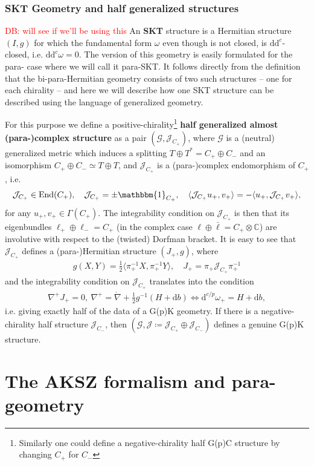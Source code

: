 \documentclass[letterpaper,12pt]{article}
\newcommand{\TT}{{T\oplus T^*}}
\newcommand{\JJ}{\mathcal{J}}
\newcommand{\GG}{\mathcal{G}}
\newcommand{\id}{\mathbbm{1}}
\newcommand{\lc}{\mathring{\n}}
\newcommand{\n}{\nabla}
\newcommand{\rd}{\mathrm{d}}
\newcommand{\se}{\Gamma}
\newcommand{\la}{\langle}
\newcommand{\ra}{\rangle}
\theoremstyle{definition}
\theoremstyle{remark}
\theoremstyle{examples}
\DeclareMathOperator{\End}{End}
\def\david{\textcolor{red}{DB: }\textcolor{red}}
\begin{document}
\subsubsection{SKT Geometry and half generalized structures}
\david{will see if we'll be using this}
An {\bf SKT} structure is a Hermitian structure $(I,g)$ for which the fundamental form $\omega$ even though is not closed, is $\rd \rd^c$-closed, i.e. $\rd \rd^c \omega=0$. The version of this geometry is easily formulated for the para- case where we will call it para-SKT. It follows directly from the definition that the bi-para-Hermitian geometry consists of two such structures -- one for each chirality -- and here we will describe how one SKT structure can be described using the language of generalized geometry.

For this purpose we define a positive-chirality\footnote{Similarly one could define a negative-chirality half G(p)C structure by changing $C_+$ for $C_-$} {\bf half generalized almost (para-)complex structure} as a pair $(\GG,\JJ_{C_+})$, where $\GG$ is a (neutral) generalized metric which induces a splitting $\TT=C_+\oplus C_-$ and an isomorphism $C_+\oplus C_-\simeq T\oplus T$, and $\JJ_{C_+}$ is a (para-)complex endomorphism of $C_+$, i.e.
\begin{align*}
\JJ_{C_+}\in \End(C_+),\quad \JJ_{C_+}=\pm \id_{C_+},\quad \la \JJ_{C_+} u_+,v_+\ra=-\la u_+,\JJ_{C_+} v_+\ra,
\end{align*}
for any $u_+,v_+ \in \se(C_+)$. The integrability condition on $\JJ_{C_+}$ is then that its eigenbundles $\ell_+\oplus \ell_-=C_+$ (in the complex case $\ell\oplus \bar{\ell}=C_+\otimes \mathbb{C}$) are involutive with respect to the (twisted) Dorfman bracket. It is easy to see that $\JJ_{C_+}$ defines a (para-)Hermitian structure $(J_+,g)$, where
\begin{align*}
g(X,Y)=\frac{1}{2}\la \pi_+^{-1}X,\pi_+^{-1}Y\ra,\quad J_+=\pi_+\JJ_{C_+}\pi^{-1}_+
\end{align*}
and the integrability condition on $\JJ_{C_+}$ translates into the condition
\begin{align*}
\n^+J_+=0,\ \n^+=\lc+\frac{1}{2}g^{-1}(H+\rd b) \Longleftrightarrow \rd^{c/p}\omega_+=H+\rd b,
\end{align*}
i.e. giving exactly half of the data of a G(p)K geometry. If there is a negative-chirality half structure $\JJ_{C_-}$, then $(\GG,\JJ\coloneqq \JJ_{C_+}\oplus \JJ_{C_-})$ defines a genuine G(p)K structure.

\section{The AKSZ formalism and para-geometry} \label{sec: AKSZ}
\end{document}
